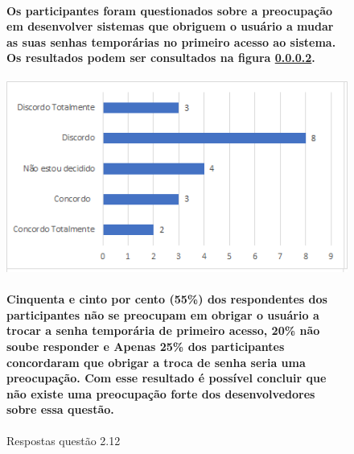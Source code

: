 \begin{figure}[!t]
\centering
\paragraph{Os participantes foram questionados sobre a preocupação em desenvolver sistemas que obriguem o usuário a mudar as suas senhas temporárias no primeiro acesso ao sistema. Os resultados podem ser consultados na figura \ref{fig:2.12}. }
\includegraphics[scale=0.7]{figuras das questoes/2.12.png}
\caption{Respostas questão 2.12}
\paragraph{
Cinquenta e cinto por cento (55{\%}) dos respondentes dos participantes não se preocupam em obrigar o usuário a trocar a senha temporária de primeiro acesso, 20{\%} não soube responder e Apenas 25{\%} dos participantes concordaram que obrigar a troca de senha seria uma preocupação. Com esse resultado é possível concluir que não existe uma preocupação forte dos desenvolvedores sobre essa questão.
}

\label{fig:2.12}
\end{figure}


